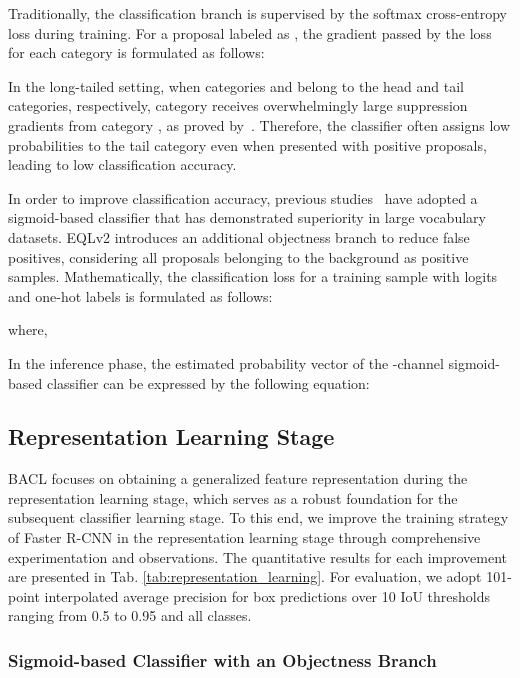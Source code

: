 \documentclass[lettersize,journal]{IEEEtran}
\begin{document}
Traditionally, the classification branch is supervised by the softmax cross-entropy loss during training.
For a proposal labeled as , the gradient passed by the loss for each category  is formulated as follows:

In the long-tailed setting, when categories  and  belong to the head and tail categories, respectively, category  receives overwhelmingly large suppression gradients from category , as proved by~\cite{tan2020equalization,wang2021seesaw}.
Therefore, the classifier often assigns low probabilities to the tail category  even when presented with positive proposals, leading to low classification accuracy.

In order to improve classification accuracy, previous studies~\cite{tan2020equalization,wang2021adaptive,tan2021equalization} have adopted a sigmoid-based classifier that has demonstrated superiority in large vocabulary datasets.
EQLv2 introduces an additional objectness branch to reduce false positives, considering all proposals belonging to the background as positive samples.
Mathematically, the classification loss for a training sample with logits  and one-hot labels  is formulated as follows:

where,


In the inference phase, the estimated probability vector  of the -channel sigmoid-based classifier can be expressed by the following equation:


\subsection{Representation Learning Stage}\label{sec:3.2}

BACL focuses on obtaining a generalized feature representation during the representation learning stage, which serves as a robust foundation for the subsequent classifier learning stage.
To this end, we improve the training strategy of Faster R-CNN in the representation learning stage through comprehensive experimentation and observations.
The quantitative results for each improvement are presented in Tab. \ref{tab:representation_learning}.
For evaluation, we adopt 101-point interpolated average precision for box predictions  over 10 IoU thresholds ranging from 0.5 to 0.95 and all classes.

\subsubsection{Sigmoid-based Classifier with an Objectness Branch}
\end{document}
